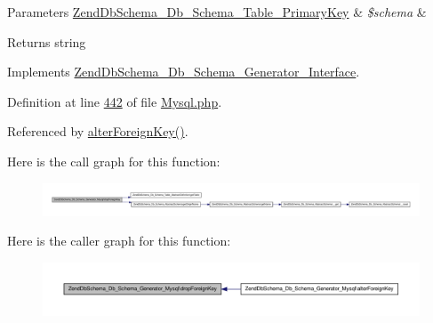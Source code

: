 \begin{DoxyParams}[1]{\-Parameters}
\hyperlink{classZendDbSchema__Db__Schema__Table__PrimaryKey}{\-Zend\-Db\-Schema\-\_\-\-Db\-\_\-\-Schema\-\_\-\-Table\-\_\-\-Primary\-Key} & {\em \$schema} & \\
\hline
\end{DoxyParams}
\begin{DoxyReturn}{\-Returns}
string 
\end{DoxyReturn}


\-Implements \hyperlink{interfaceZendDbSchema__Db__Schema__Generator__Interface_a702317a271f73bc0009ccc44cc90b975}{\-Zend\-Db\-Schema\-\_\-\-Db\-\_\-\-Schema\-\_\-\-Generator\-\_\-\-Interface}.



\-Definition at line \hyperlink{Schema_2Generator_2Mysql_8php_source_l00442}{442} of file \hyperlink{Schema_2Generator_2Mysql_8php_source}{\-Mysql.\-php}.



\-Referenced by \hyperlink{Schema_2Generator_2Mysql_8php_source_l00426}{alter\-Foreign\-Key()}.



\-Here is the call graph for this function\-:\nopagebreak
\begin{figure}[H]
\begin{center}
\leavevmode
\includegraphics[width=350pt]{classZendDbSchema__Db__Schema__Generator__Mysql_afa7990c889464576d30d4a110e9b0fac_cgraph}
\end{center}
\end{figure}




\-Here is the caller graph for this function\-:\nopagebreak
\begin{figure}[H]
\begin{center}
\leavevmode
\includegraphics[width=350pt]{classZendDbSchema__Db__Schema__Generator__Mysql_afa7990c889464576d30d4a110e9b0fac_icgraph}
\end{center}
\end{figure}


